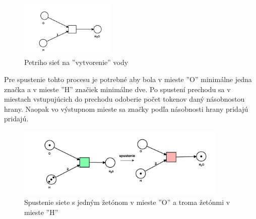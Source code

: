 \begin{figure}[h]
	\centerline{\includegraphics[width=0.4\textwidth]{images/vojvoda}}
	\caption{Petriho sieť na ''vytvorenie'' vody}
	\label{obr:voda}
\end{figure}


Pre spustenie tohto procesu je potrebné aby bola v mieste ''O'' minimálne jedna značka a v mieste ''H'' značiek minimálne dve. Po spustení prechodu sa v miestach vstupujúcich do prechodu odoberie počet tokenov daný násobnostou hrany. Naopak vo výstupnom mieste sa značky podľa násobnosti hrany pridajú pridajú.  

\begin{figure}[h]
	\centerline{\includegraphics[width=0.9\textwidth]{images/vojvoda2}}
	\caption{Spustenie siete s jedným žetónom v mieste ''O'' a troma žetónmi v mieste ''H''}
	\label{obr:voda2}
\end{figure}





